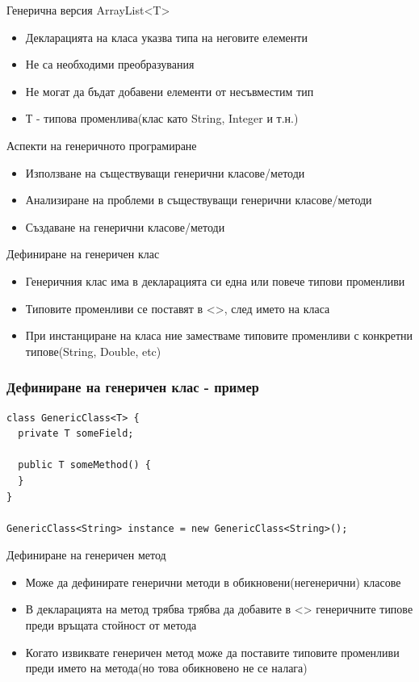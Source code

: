 \documentclass{beamer}
\begin{document}
\begin{frame}{Генерична версия ArrayList<T>}
  \transdissolve
  \begin{itemize}
  \item Декларацията на класа указва типа на неговите елементи
  \item Не са необходими преобразувания
  \item Не могат да бъдат добавени елементи от несъвместим тип
  \item Т - типова променлива(клас като String, Integer и т.н.)
  \end{itemize}
\end{frame}

\begin{frame}{Аспекти на генеричното програмиране}
  \transdissolve
  \begin{itemize}
  \item Използване на съществуващи генерични класове/методи
  \item Анализиране на проблеми в съществуващи генерични
    класове/методи
  \item Създаване на генерични класове/методи
  \end{itemize}
\end{frame}

\begin{frame}{Дефиниране на генеричен клас}
  \transdissolve
  \begin{itemize}
  \item Генеричния клас има в декларацията си
    една или повече типови променливи
   \item Типовите променливи се поставят в <>,
    след името на класа
   \item При инстанциране на класа ние
    заместваме типовите променливи с
    конкретни типове(String, Double, etc)
  \end{itemize}
\end{frame}

\begin{frame}[fragile]
  \frametitle{Дефиниране на генеричен клас - пример}
  \transdissolve
\begin{lstlisting}
class GenericClass<T> {
  private T someField;
  
  public T someMethod() {
  }
}

GenericClass<String> instance = new GenericClass<String>();
\end{lstlisting}
\end{frame}

\begin{frame}{Дефиниране на генеричен метод}
  \transdissolve
  \begin{itemize}
  \item   Може да дефинирате генерични методи
    в обикновени(негенерични) класове
   \item В декларацията на метод трябва трябва
    да добавите в <> генеричните типове
    преди връщата стойност от метода
   \item Когато извиквате генеричен метод може
    да поставите типовите променливи
    преди името на метода(но това
    обикновено не се налага)
  \end{itemize}
\end{frame}
\end{document}
